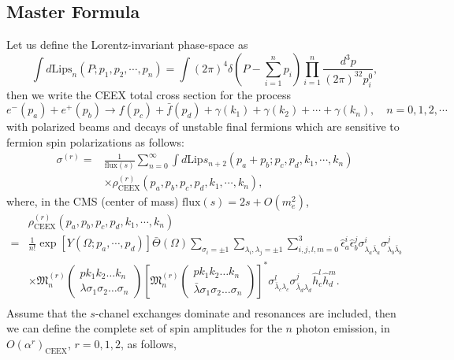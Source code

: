 \subsection{Master Formula}

Let us define the Lorentz-invariant phase-space as
\begin{equation}
\int d\text{Lips}_n(P;p_1,p_2,\cdots,p_n)=\int (2\pi)^4\delta\left(P-\sum_{i=1}^{n}p_i\right)\prod_{i=1}^n\frac{d^3p}{(2\pi)^32p^0_i},
\end{equation}
then we write the CEEX total cross section for the process
\begin{equation}
e^-(p_a)+e^+(p_b)\to f(p_c)+\bar{f}(p_d)+\gamma(k_1)+\gamma(k_2)+\cdots+\gamma(k_n),\quad n=0,1,2,\cdots
\end{equation}
with polarized beams and decays of unstable final fermions which are sensitive to fermion spin polarizations as follows:
\begin{align}
\sigma^{(r)}=&\frac{1}{\text{flux}(s)}\sum_{n=0}^{\infty}\int d\text{Lip}s_{n+2}(p_a+p_b;p_c,p_d,k_1,\cdots,k_n)\nonumber\\
&\times\rho_{\text{CEEX}}^{(r)}(p_a,p_b,p_c,p_d,k_1,\cdots,k_n),
\end{align}
where, in the CMS (center of mass) $\text{flux}(s)=2s+O(m^2_e)$,
\begin{align}
&\rho_{\text{CEEX}}^{(r)}(p_a,p_b,p_c,p_d,k_1,\cdots,k_n)\nonumber\\
=&\frac{1}{n!}\exp[Y(\Omega;p_a,\cdots,p_d)]\bar{\Theta}(\Omega)\sum_{\sigma_i=\pm 1}\sum_{\lambda_i,\lambda_j=\pm 1}\sum_{i,j,l,m=0}^{3}\hat{\epsilon}^i_a\hat{\epsilon}^j_b\sigma^i_{\lambda_a\bar{\lambda}_a}\sigma^j_{\lambda_b\bar{\lambda}_b}\nonumber\\
&\times \mathfrak{M}_n^{(r)}\left( \begin{array}{cc}
pk_1k_2\ldots k_n\\\lambda\sigma_1\sigma_2\ldots\sigma_n
\end{array} \right)\left[\mathfrak{M}_n^{(r)}\left( \begin{array}{cc}
pk_1k_2\ldots k_n\\\bar{\lambda}\sigma_1\sigma_2\ldots\sigma_n
\end{array} \right)\right]^\ast\sigma^l_{\bar{\lambda}_c\lambda_c}\sigma^j_{\bar{\lambda}_d\lambda_d}\hat{h}^l_c\hat{h}^m_d.\nonumber\\
\end{align}
Assume that the $s$-chanel exchanges dominate and resonances are included, then we can define the complete set of spin amplitudes for the $n$ photon emission, in $O(\alpha^r)_\text{CEEX}$, $r=0,1,2$, as follows,
